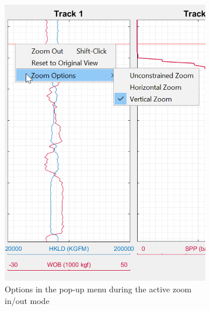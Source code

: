 \documentclass[12pt,a4paper,oneside]{report}
\begin{document}
\begin{figure}[ht]
\centering
\begin{subfigure}[b]{0.45\textwidth}
    \includegraphics[width=\textwidth]{zoom.png}
    \caption{Options in the pop-up menu during the active zoom in/out mode}
\end{subfigure}
\hfill
  \begin{subfigure}[b]{0.45\textwidth}

\end{subfigure}
\end{figure}
\end{document}
